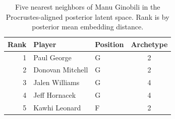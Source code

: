 \begin{table}[htbp]
  \centering\small
  \begin{tabular}{rllc}
    \toprule
    Rank & Player & Position & Archetype \\
    \midrule
    1 & Paul George & G & 2 \\
    2 & Donovan Mitchell & G & 2 \\
    3 & Jalen Williams & G & 4 \\
    4 & Jeff Hornacek & G & 4 \\
    5 & Kawhi Leonard & F & 2 \\
    \bottomrule
  \end{tabular}
  \caption{Five nearest neighbors of Manu Ginobili in the Procrustes-aligned posterior latent space. Rank is by posterior mean embedding distance.}
  \label{tab:Manu_Ginobili_neighbors}
\end{table}

